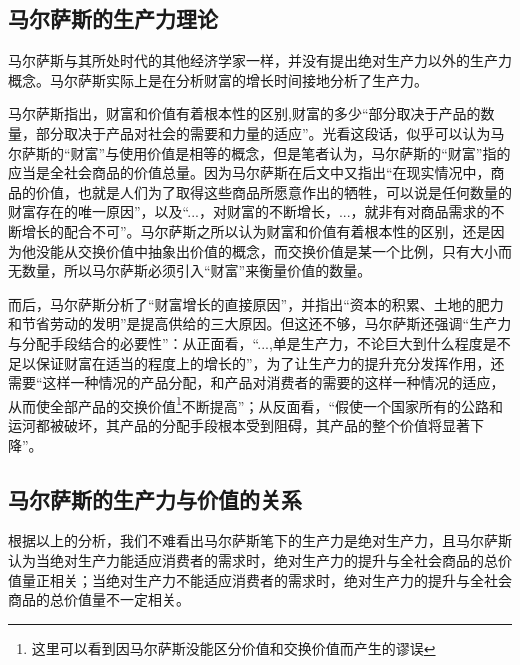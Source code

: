 \subsection{马尔萨斯的生产力理论}

马尔萨斯与其所处时代的其他经济学家一样，并没有提出绝对生产力以外的生产力概念。马尔萨斯实际上是在分析财富的增长时间接地分析了生产力。

马尔萨斯指出，财富和价值有着根本性的区别,财富的多少“部分取决于产品的数量，部分取决于产品对社会的需要和力量的适应”\cite[292]{BiLuo*SiLaFaDaWeiLiJiaTuQuanJiDi2JuanMaErSaSiZhengZhiJingJiXueYuanLiPingZhu2013}。光看这段话，似乎可以认为马尔萨斯的“财富”与使用价值是相等的概念，但是笔者认为，马尔萨斯的“财富”指的应当是全社会商品的价值总量。因为马尔萨斯在后文中又指出“在现实情况中，商品的价值，也就是人们为了取得这些商品所愿意作出的牺牲，可以说是任何数量的财富存在的唯一原因”\cite[292]{BiLuo*SiLaFaDaWeiLiJiaTuQuanJiDi2JuanMaErSaSiZhengZhiJingJiXueYuanLiPingZhu2013}，以及“...，对财富的不断增长，...，就非有对商品需求的不断增长的配合不可”\cite[355]{BiLuo*SiLaFaDaWeiLiJiaTuQuanJiDi2JuanMaErSaSiZhengZhiJingJiXueYuanLiPingZhu2013}。马尔萨斯之所以认为财富和价值有着根本性的区别，还是因为他没能从交换价值中抽象出价值的概念，而交换价值是某一个比例，只有大小而无数量，所以马尔萨斯必须引入“财富”来衡量价值的数量。

而后，马尔萨斯分析了“财富增长的直接原因”，并指出“资本的积累、土地的肥力和节省劳动的发明”是提高供给的三大原因\cite[355]{BiLuo*SiLaFaDaWeiLiJiaTuQuanJiDi2JuanMaErSaSiZhengZhiJingJiXueYuanLiPingZhu2013}。但这还不够，马尔萨斯还强调“生产力与分配手段结合的必要性”\cite[356]{BiLuo*SiLaFaDaWeiLiJiaTuQuanJiDi2JuanMaErSaSiZhengZhiJingJiXueYuanLiPingZhu2013}：从正面看，“...,单是生产力，不论巨大到什么程度是不足以保证财富在适当的程度上的增长的”，为了让生产力的提升充分发挥作用，还需要“这样一种情况的产品分配，和产品对消费者的需要的这样一种情况的适应，从而使全部产品的交换价值\footnote{这里可以看到因马尔萨斯没能区分价值和交换价值而产生的谬误}不断提高”\cite[356]{BiLuo*SiLaFaDaWeiLiJiaTuQuanJiDi2JuanMaErSaSiZhengZhiJingJiXueYuanLiPingZhu2013}；从反面看，“假使一个国家所有的公路和运河都被破坏，其产品的分配手段根本受到阻碍，其产品的整个价值将显著下降”\cite[357]{BiLuo*SiLaFaDaWeiLiJiaTuQuanJiDi2JuanMaErSaSiZhengZhiJingJiXueYuanLiPingZhu2013}。

\subsection{马尔萨斯的生产力与价值的关系}

根据以上的分析，我们不难看出马尔萨斯笔下的生产力是绝对生产力，且马尔萨斯认为当绝对生产力能适应消费者的需求时，绝对生产力的提升与全社会商品的总价值量正相关；当绝对生产力不能适应消费者的需求时，绝对生产力的提升与全社会商品的总价值量不一定相关。

